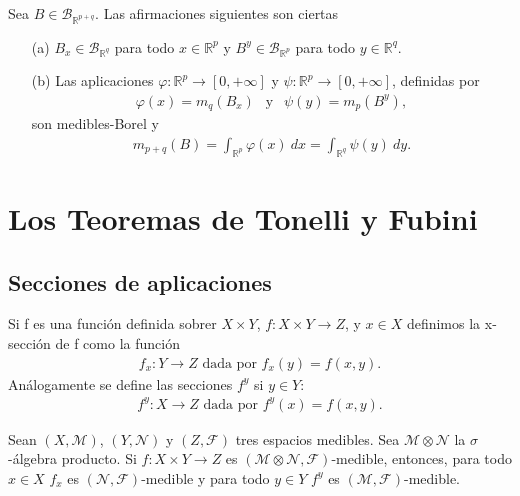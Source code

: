 \begin{cor}
    Sea $B \in \mathcal{B}_{\mathbb{R}^{p+q}}$. Las afirmaciones siguientes son ciertas
    \begin{enumerate}
        \item[(a)] $B_x \in \mathcal{B}_{\mathbb{R}^{q}}$ para todo $x \in \mathbb{R}^{p}$ y $B^y \in \mathcal{B}_{\mathbb{R}^{p}}$ para todo $y \in \mathbb{R}^{q}$.
        \item[(b)] Las aplicaciones $\varphi: \mathbb{R}^p \longrightarrow [0,+\infty]$ y $\psi: \mathbb{R}^p \longrightarrow [0,+\infty]$, definidas por
              \begin{align*}
                  \varphi(x) = m_q(B_x) \ \ \text{ y } \ \ \psi(y) = m_p(B^y),
              \end{align*}
              son medibles-Borel y
              \begin{align*}
                  m_{p+q}(B) = \int_{\mathbb{R}^p}{\varphi(x) \ dx} = \int_{\mathbb{R}^q}{\psi(y) \ dy}.
              \end{align*}
    \end{enumerate}
\end{cor}

\section{Los Teoremas de Tonelli y Fubini}

\subsection{Secciones de aplicaciones}

\begin{defi}
    Si f es una función definida sobrer $X \times Y$, $f: X \times Y \longrightarrow Z$, y $x \in X$ definimos la x-sección de f como la función
    \begin{align*}
        f_x : Y \longrightarrow Z \text{ dada por } f_x(y) = f(x,y).
    \end{align*}
    Análogamente se define las secciones $f^y$ si $y \in Y$:
    \begin{align*}
        f^y : X \longrightarrow Z \text{ dada por } f^y(x) = f(x,y).
    \end{align*}
\end{defi}

\begin{prop}
    Sean $(X, \mathcal{M})$, $(Y, \mathcal{N})$ y $(Z, \mathcal{F})$ tres espacios medibles. Sea $\mathcal{M} \otimes \mathcal{N}$ la $\sigma$-álgebra producto. Si $f: X \times Y \longrightarrow Z$ es $(\mathcal{M} \otimes \mathcal{N}, \mathcal{F})$-medible, entonces, para todo $x \in X$ $f_x$ es $(\mathcal{N}, \mathcal{F})$-medible y para todo $y \in Y$ $f^y$ es $(\mathcal{M}, \mathcal{F})$-medible.
\end{prop}

